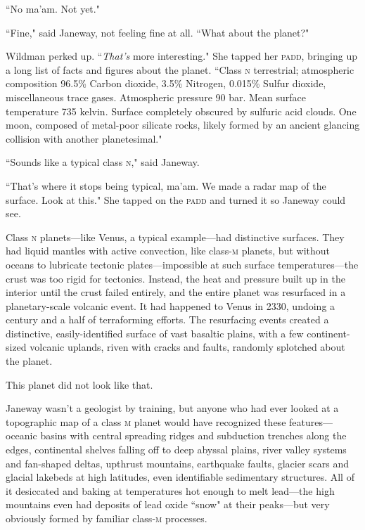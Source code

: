 \documentclass[twoside,letterpaper,12pt]{memoir}
\begin{document}
``No ma'am. Not yet."

``Fine," said Janeway, not feeling fine at all. ``What about the planet?"

Wildman perked up. ``\textit{That's} more interesting." She tapped her \textsc{padd}, bringing up a long list of facts and figures about the planet. ``Class \textsc{n} terrestrial; atmospheric composition 96.5\% Carbon dioxide, 3.5\% Nitrogen, 0.015\% Sulfur dioxide, miscellaneous trace gases. Atmospheric pressure 90 bar. Mean surface temperature 735 kelvin. Surface completely obscured by sulfuric acid clouds. One moon, composed of metal-poor silicate rocks, likely formed by an ancient glancing collision with another planetesimal."

``Sounds like a typical class \textsc{n}," said Janeway.

``That's where it stops being typical, ma'am. We made a radar map of the surface. Look at this." She tapped on the \textsc{padd} and turned it so Janeway could see.

Class \textsc{n} planets---like Venus, a typical example---had distinctive surfaces. They had liquid mantles with active convection, like class-\textsc{m} planets, but without oceans to lubricate tectonic plates---impossible at such surface temperatures---the crust was too rigid for tectonics. Instead, the heat and pressure built up in the interior until the crust failed entirely, and the entire planet was resurfaced in a planetary-scale volcanic event. It had happened to Venus in 2330, undoing a century and a half of terraforming efforts. The resurfacing events created a distinctive, easily-identified surface of vast basaltic plains, with a few continent-sized volcanic uplands, riven with cracks and faults, randomly splotched about the planet.

This planet did not look like that.

Janeway wasn't a geologist by training, but anyone who had ever looked at a topographic map of a class \textsc{m} planet would have recognized these features---oceanic basins with central spreading ridges and subduction trenches along the edges, continental shelves falling off to deep abyssal plains, river valley systems and fan-shaped deltas, upthrust mountains, earthquake faults, glacier scars and glacial lakebeds at high latitudes, even identifiable sedimentary structures. All of it desiccated and baking at temperatures hot enough to melt lead---the high mountains even had deposits of lead oxide ``snow" at their peaks---but very obviously formed by familiar class-\textsc{m} processes.
\end{document}
